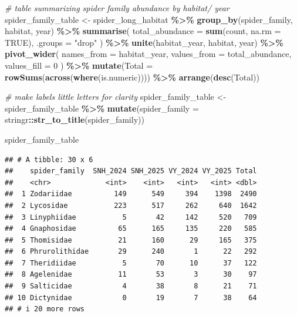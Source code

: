 \documentclass[
]{article}
\newenvironment{Shaded}{\begin{snugshade}}{\end{snugshade}}
\newcommand{\AttributeTok}[1]{\textcolor[rgb]{0.13,0.29,0.53}{#1}}
\newcommand{\CommentTok}[1]{\textcolor[rgb]{0.56,0.35,0.01}{\textit{#1}}}
\newcommand{\ConstantTok}[1]{\textcolor[rgb]{0.56,0.35,0.01}{#1}}
\newcommand{\DecValTok}[1]{\textcolor[rgb]{0.00,0.00,0.81}{#1}}
\newcommand{\FunctionTok}[1]{\textcolor[rgb]{0.13,0.29,0.53}{\textbf{#1}}}
\newcommand{\NormalTok}[1]{#1}
\newcommand{\OtherTok}[1]{\textcolor[rgb]{0.56,0.35,0.01}{#1}}
\newcommand{\SpecialCharTok}[1]{\textcolor[rgb]{0.81,0.36,0.00}{\textbf{#1}}}
\newcommand{\StringTok}[1]{\textcolor[rgb]{0.31,0.60,0.02}{#1}}
\begin{document}
\begin{Shaded}
\begin{Highlighting}[]
\CommentTok{\# table summarizing spider family abundance by habitat/ year}
\NormalTok{spider\_family\_table }\OtherTok{\textless{}{-}}\NormalTok{ spider\_long\_habitat }\SpecialCharTok{\%\textgreater{}\%}
  \FunctionTok{group\_by}\NormalTok{(spider\_family, habitat, year) }\SpecialCharTok{\%\textgreater{}\%}
  \FunctionTok{summarise}\NormalTok{(}
    \AttributeTok{total\_abundance =} \FunctionTok{sum}\NormalTok{(count, }\AttributeTok{na.rm =} \ConstantTok{TRUE}\NormalTok{),}
    \AttributeTok{.groups =} \StringTok{"drop"}
\NormalTok{  ) }\SpecialCharTok{\%\textgreater{}\%}
  \FunctionTok{unite}\NormalTok{(habitat\_year, habitat, year) }\SpecialCharTok{\%\textgreater{}\%}
  \FunctionTok{pivot\_wider}\NormalTok{(}
    \AttributeTok{names\_from  =}\NormalTok{ habitat\_year,}
    \AttributeTok{values\_from =}\NormalTok{ total\_abundance,}
    \AttributeTok{values\_fill =} \DecValTok{0}
\NormalTok{  ) }\SpecialCharTok{\%\textgreater{}\%}
  \FunctionTok{mutate}\NormalTok{(}\AttributeTok{Total =} \FunctionTok{rowSums}\NormalTok{(}\FunctionTok{across}\NormalTok{(}\FunctionTok{where}\NormalTok{(is.numeric)))) }\SpecialCharTok{\%\textgreater{}\%}
  \FunctionTok{arrange}\NormalTok{(}\FunctionTok{desc}\NormalTok{(Total))}

\CommentTok{\# make labels little letters for clarity}
\NormalTok{spider\_family\_table }\OtherTok{\textless{}{-}}\NormalTok{ spider\_family\_table }\SpecialCharTok{\%\textgreater{}\%}
  \FunctionTok{mutate}\NormalTok{(}\AttributeTok{spider\_family =}\NormalTok{ stringr}\SpecialCharTok{::}\FunctionTok{str\_to\_title}\NormalTok{(spider\_family))}

\NormalTok{spider\_family\_table}
\end{Highlighting}
\end{Shaded}

\begin{verbatim}
## # A tibble: 30 x 6
##    spider_family  SNH_2024 SNH_2025 VY_2024 VY_2025 Total
##    <chr>             <int>    <int>   <int>   <int> <dbl>
##  1 Zodariidae          149      549     394    1398  2490
##  2 Lycosidae           223      517     262     640  1642
##  3 Linyphiidae           5       42     142     520   709
##  4 Gnaphosidae          65      165     135     220   585
##  5 Thomisidae           21      160      29     165   375
##  6 Phrurolithidae       29      240       1      22   292
##  7 Theridiidae           5       70      10      37   122
##  8 Agelenidae           11       53       3      30    97
##  9 Salticidae            4       38       8      21    71
## 10 Dictynidae            0       19       7      38    64
## # i 20 more rows
\end{verbatim}
\end{document}
